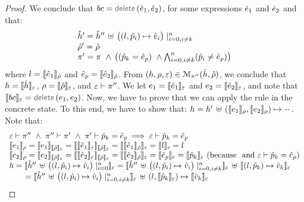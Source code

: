 \begin{proof}
\noindent{}
We conclude that $\bcmd = \jsildelete(\sexpr_1, \sexpr_2)$, for some expressions $\sexpr_1$ and $\sexpr_2$
and that: 
$$
\begin{array}{l}
\sheap' = \sheap'' \, \uplus \,  \big((\loc, \sexprp_i) \mapsto \sexprv_i\big)\mid_{i = 0, i \neq k}^n
\\ 
\sstore' = \sstore
\\ 
 \pc' = \pc \ \wedge \, \big( (\sexprp_k = \sexpr_p) \ \wedge \bigwedge_{i = 0, i \neq k}^n (\sexprp_i \neq \sexpr_p) \big)
\end{array}
$$
where $\loc = \symbeval{\sexpr_1}{\sstore}$ and $\sexpr_p = \symbeval{\sexpr_2}{\sstore}$.
From $(\heap, \store, \senv) \in \smodels{\sheap, \sstore}{\pc''}$, we conclude that $\heap = \semexpr{\sheap}{\senv}$, $\store = \semexpr{\sstore}{\senv}$, and 
$\senv \vdash \pc''$. We let $\jsilexpr_1 = \symbeval{\sexpr_1}{\senv}$ and 
$\jsilexpr_2 = \symbeval{\sexpr_2}{\senv}$, and note that $\symbeval{\bcmd}{\senv} = \jsildelete(\jsilexpr_1, \jsilexpr_2)$.
Now, we have to prove that we can apply the  rule in the concrete state.
To this end, we have to show that:
$\heap = \heap' \dunion \hcell{\symbeval{\jsilexpr_1}{\store}}{\symbeval{\jsilexpr_2}{\store}}{-}$. 
Note that: 
$$
\begin{array}{l}
%
\senv \vdash \pc'' \ \wedge \ \pc'' \vdash \pc' \ \wedge \ \pc' \vdash \sexprp_k = \sexpr_p \implies \senv \vdash \sexprp_k = \sexpr_p \\
%
 \symbeval{\jsilexpr_1}{\store} = \symbeval{\jsilexpr_1}{\symbeval{\sstore}{\senv}} = \symbeval{\symbeval{\sexpr_1}{\senv}}{\symbeval{\sstore}{\senv}} = \symbeval{\symbeval{\sexpr_1}{\sstore}}{\senv} 
    = \symbeval{\loc}{\senv} = \loc \\ 
  \symbeval{\jsilexpr_2}{\store}  = \symbeval{\jsilexpr_2}{\semexpr{\sstore}{\senv}} =  \symbeval{\symbeval{\sexpr_2}{\senv}}{\symbeval{\sstore}{\senv}} = \symbeval{\symbeval{\sexpr_2}{\sstore}}{\senv}
   =  \symbeval{\sexpr_p}{\senv} = \symbeval{\sexprp_k}{\senv}  \text{ (because $$ and $\senv \vdash \sexprp_k = \sexpr_p$)} \\
 \heap = \semexpr{\sheap'' \, \uplus \, \big((l, \sexprp_i) \mapsto \sexprv_i\big)\mid_{i = 0}^n}{\senv} 
       =  \semexpr{\sheap'' \, \uplus \, \big((l, \sexprp_i) \mapsto \sexprv_i\big)\mid_{i = 0, i \neq k}^n}{\senv} \dunion \semexpr{(l, \sexprp_k) \mapsto \sexprv_k}{\senv} \\
         \qquad = \semexpr{\sheap'' \, \uplus \, \big((l, \sexprp_i) \mapsto \sexprv_i\big)\mid_{i = 0, i \neq k}^n}{\senv} \dunion (l, \semexpr{\sexprp_k}{\senv}) \mapsto \semexpr{\sexprv_k}{\senv}  \\ 

\end{array}$$
\end{proof}
